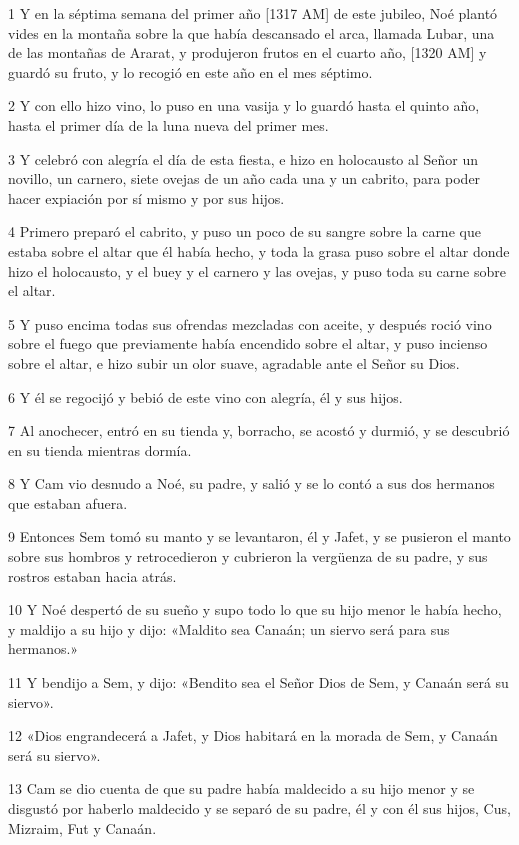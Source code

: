 \par 1 Y en la séptima semana del primer año [1317 AM] de este jubileo, Noé plantó vides en la montaña sobre la que había descansado el arca, llamada Lubar, una de las montañas de Ararat, y produjeron frutos en el cuarto año, [1320 AM] y guardó su fruto, y lo recogió en este año en el mes séptimo.
\par 2 Y con ello hizo vino, lo puso en una vasija y lo guardó hasta el quinto año, hasta el primer día de la luna nueva del primer mes.
\par 3 Y celebró con alegría el día de esta fiesta, e hizo en holocausto al Señor un novillo, un carnero, siete ovejas de un año cada una y un cabrito, para poder hacer expiación por sí mismo y por sus hijos.
\par 4 Primero preparó el cabrito, y puso un poco de su sangre sobre la carne que estaba sobre el altar que él había hecho, y toda la grasa puso sobre el altar donde hizo el holocausto, y el buey y el carnero y las ovejas, y puso toda su carne sobre el altar.
\par 5 Y puso encima todas sus ofrendas mezcladas con aceite, y después roció vino sobre el fuego que previamente había encendido sobre el altar, y puso incienso sobre el altar, e hizo subir un olor suave, agradable ante el Señor su Dios.
\par 6 Y él se regocijó y bebió de este vino con alegría, él y sus hijos.
\par 7 Al anochecer, entró en su tienda y, borracho, se acostó y durmió, y se descubrió en su tienda mientras dormía.
\par 8 Y Cam vio desnudo a Noé, su padre, y salió y se lo contó a sus dos hermanos que estaban afuera.
\par 9 Entonces Sem tomó su manto y se levantaron, él y Jafet, y se pusieron el manto sobre sus hombros y retrocedieron y cubrieron la vergüenza de su padre, y sus rostros estaban hacia atrás.
\par 10 Y Noé despertó de su sueño y supo todo lo que su hijo menor le había hecho, y maldijo a su hijo y dijo: «Maldito sea Canaán; un siervo será para sus hermanos.»
\par 11 Y bendijo a Sem, y dijo: «Bendito sea el Señor Dios de Sem, y Canaán será su siervo».
\par 12 «Dios engrandecerá a Jafet, y Dios habitará en la morada de Sem, y Canaán será su siervo».
\par 13 Cam se dio cuenta de que su padre había maldecido a su hijo menor y se disgustó por haberlo maldecido y se separó de su padre, él y con él sus hijos, Cus, Mizraim, Fut y Canaán.

